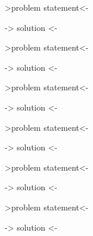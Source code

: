 \documentclass[12pt]{article}
\newenvironment{problem}[2][Problem]
{
	\begin{trivlist} 
		\item[\hskip \labelsep {\bfseries #1 #2:}]
	}
{
	\end{trivlist}
	}
\newenvironment{solution}[1][Solution]
{
	\begin{trivlist} 
		\item[\hskip \labelsep {\itshape #1:}]
	}
	{
	\end{trivlist}
}
\begin{document}
\begin{problem}{1}
->problem statement<-
\noindent
\newline
\newline
\begin{solution}
-> solution <-
\end{solution}
\end{problem}






\newpage
\begin{problem}{2}
->problem statement<-
\noindent
\newline
\newline
\begin{solution}
-> solution <-
\end{solution}
\end{problem}






\newpage
\begin{problem}{3}
->problem statement<-
\noindent
\newline
\newline
\begin{solution}
-> solution <-
\end{solution}
\end{problem}






\newpage
\begin{problem}{4}
->problem statement<-
\noindent
\newline
\newline
\begin{solution}
-> solution <-
\end{solution}
\end{problem}






\newpage
\begin{problem}{5}
->problem statement<-
\noindent
\newline
\newline
\begin{solution}
-> solution <-
\end{solution}
\end{problem}






\newpage
\begin{problem}{6}
->problem statement<-
\noindent
\newline
\newline
\begin{solution}
-> solution <-
\end{solution}
\end{problem}
\end{document}
